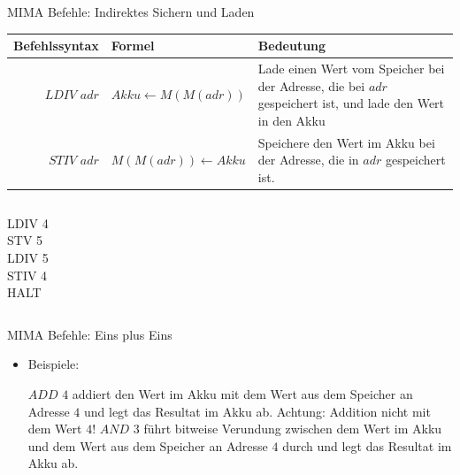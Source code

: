 \begin{frame}{MIMA Befehle: Indirektes Sichern und Laden}
	\begin{tabular}{r | l p{5cm} }
		Befehlssyntax & Formel & Bedeutung\\\hline\hline 
		$LDIV$ $adr$ & $Akku \leftarrow M(M(adr))$ & Lade einen Wert vom Speicher bei der Adresse, die bei $adr$ gespeichert ist, und lade den Wert in den Akku\\\hline
		$STIV$ $adr$ & $M(M(adr)) \leftarrow Akku$ & Speichere den Wert im Akku bei der Adresse, die in $adr$ gespeichert ist.
	\end{tabular}
	
	\bp 
	\vspace{.5cm}
	\vspace{.2cm}
	
	\begin{columns}
		\begin{column}{0.5\textwidth}
			LDIV 4 \\ STV 5 \\ LDIV 5 \\ STIV 4 \\ HALT
		\end{column}
		
		\begin{column}{0.5\textwidth}
			\begin{memory}
			\end{memory}
		\end{column}
	\end{columns}
\end{frame}

\begin{frame}{MIMA Befehle: Eins plus Eins}
	\begin{itemize}
		\pitem Befehle zu arithmetischen Operationen
		\pitem Eine ALU-Operation, angewandt auf dem Wert des Akkus und dem Wert an gegebener Adresse
		
		\bp
		
		\item Beispiele:
		\begin{itemize}
			\pitem $ADD$ $4$ addiert den Wert im Akku mit dem Wert aus dem Speicher an Adresse $4$ und legt das Resultat im Akku ab\ip . Achtung: Addition nicht mit dem Wert $4$!
			\pitem $AND$ $3$ führt bitweise Verundung zwischen dem Wert im Akku und dem Wert aus dem Speicher an Adresse $4$ durch und legt das Resultat im Akku ab.
		\end{itemize}
	\end{itemize}
\end{frame}


